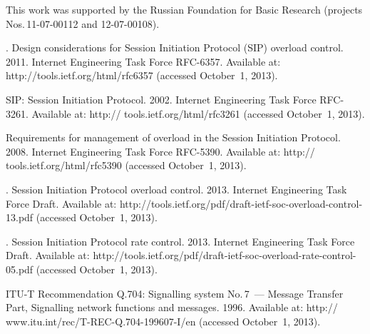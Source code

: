 
\vspace*{-6pt}

\Ack
\noindent
This work was supported by the Russian Foundation for Basic Research
(projects Nos.\,11-07-00112 and 12-07-00108).



  \begin{multicols}{2}

\renewcommand{\bibname}{\protect\rmfamily References}

{\small\frenchspacing
{%
\begin{thebibliography}{99}

.
Design considerations for Session Initiation
Protocol (SIP) overload control. 2011. Internet Engineering Task Force
RFC-6357. Available at:
{\sf http://tools.ietf.org/html/rfc6357} (accessed October~1, 2013).

SIP: Session  Initiation  Protocol. 2002. Internet Engineering Task Force
RFC-3261. 
Available at: {\sf http:// tools.ietf.org/html/rfc3261} (accessed October~1, 2013).

Requirements for management of overload in the
Session Initiation Protocol. 2008. Internet Engineering Task Force
RFC-5390. 
Available at:
{\sf http:// tools.ietf.org/html/rfc5390} (accessed October~1, 2013).

.
Session Initiation Protocol overload control. 2013.
Internet Engineering Task Force Draft.
Available at:
{\sf http://tools.ietf.org/pdf/draft-ietf-soc-overload-control-13.pdf} 
(accessed October~1, 2013).

.
Session Initiation Protocol rate control. 2013. Internet Engineering Task Force Draft.
Available at:
{\sf http://tools.ietf.org/pdf/draft-ietf-soc-overload-rate-control-05.pdf} 
(accessed October~1, 2013).

ITU-T Recommendation Q.704:
Signalling system No.\,7~--- Message Transfer
Part, Signalling network functions and messages. 1996.
Available at:
{\sf http:// www.itu.int/rec/T-REC-Q.704-199607-I/en} (accessed October~1, 2013).


\end{thebibliography}}}
\end{multicols}
